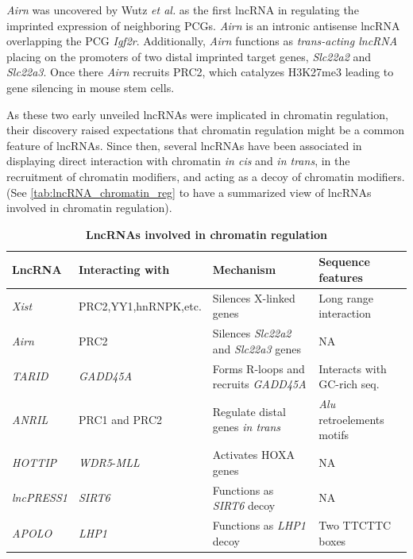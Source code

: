 \textit{Airn} was uncovered by Wutz \textit{et al.} as the first lncRNA in regulating the imprinted expression of neighboring PCGs.\autocite{wutz_1997_imprinted} \textit{Airn} is an intronic antisense lncRNA overlapping the PCG \textit{Igf2r}. Additionally, \textit{Airn} functions as \textit{trans-acting lncRNA} placing on the promoters of two distal imprinted target genes, \textit{Slc22a2} and \textit{Slc22a3}. Once there \textit{Airn} recruits PRC2, which catalyzes H3K27me3 leading to gene silencing in mouse stem cells.\autocite{schertzer_2019_airn}

As these two early unveiled lncRNAs were implicated in chromatin regulation, their discovery raised expectations that chromatin regulation might be a common feature of lncRNAs. Since then, several lncRNAs have been associated in displaying direct interaction with chromatin \textit{in cis} and \textit{in trans}, in the recruitment of chromatin modifiers, and acting as a decoy of chromatin modifiers. (See \autoref{tab:lncRNA_chromatin_reg} to have a summarized view of lncRNAs involved in chromatin regulation). 

\begin{table}[!htb]
  \caption[LncRNAs involved in chromatin regulation]{\textbf{LncRNAs involved in chromatin regulation}}
  \begin{scriptsize}
    \begin{tabulary}{0.65\linewidth}{llll}
      \textbf{LncRNA} & \textbf{Interacting with} & \textbf{Mechanism} & \textbf{Sequence features} \\ \hline
      \textit{Xist}\autocite{loda_2019_xist} & PRC2,YY1,hnRNPK,etc. & Silences X-linked genes & Long range interaction \\
      \textit{Airn}\autocite{schertzer_2019_airn} & PRC2 & Silences \textit{Slc22a2} and \textit{Slc22a3} genes & NA \\
      \textit{TARID}\autocite{arab_2019_gadd45a} & \textit{GADD45A} & Forms R-loops and recruits \textit{GADD45A} & Interacts with GC-rich seq. \\
      \textit{ANRIL}\autocite{holdt_2013_anril} & PRC1 and PRC2 & Regulate distal genes \textit{in trans} & \textit{Alu} retroelements motifs \\
      \textit{HOTTIP}\autocite{luo_2019_hottip} & \textit{WDR5}-\textit{MLL} & Activates HOXA genes & NA \\
      \textit{lncPRESS1}\autocite{jain_2016_lncpress1} & \textit{SIRT6} & Functions as \textit{SIRT6} decoy & NA \\
      \textit{APOLO}\autocite{mas_2020_apolo} & \textit{LHP1} & Functions as \textit{LHP1} decoy & Two TTCTTC boxes \\
    \end{tabulary}
  \end{scriptsize}
  \label{tab:lncRNA_chromatin_reg}
\end{table}

